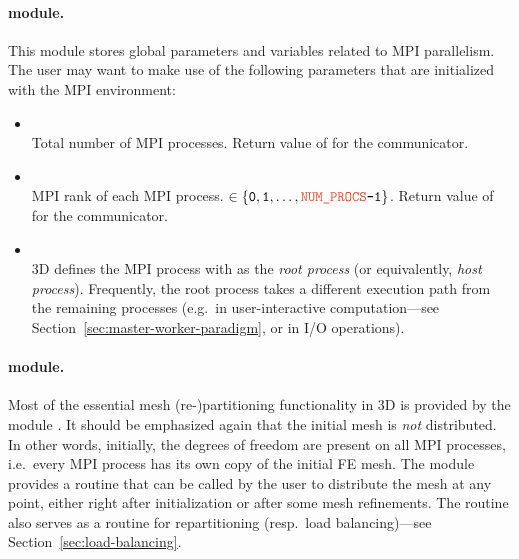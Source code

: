 \paragraph{ module.} This module stores global parameters and variables related to MPI parallelism. The user may want to make use of the following parameters that are initialized with the MPI environment:
\begin{itemize}
	\item {} \\
	Total number of MPI processes. Return value of  for the  communicator.
	\item {} \\
	MPI rank of each MPI process.  $\in \{ \code{0}, \code{1}, \dots, \code{\var{NUM\_PROCS}-1} \}$.
	Return value of  for the  communicator.
	\item {} \\
	\hp3D defines the MPI process with  as the \emph{root process} (or equivalently, \emph{host process}). Frequently, the root process takes a different execution path from the remaining processes (e.g.~in user-interactive computation---see Section~\ref{sec:master-worker-paradigm}, or in I/O operations).
\end{itemize}

\paragraph{ module.}
Most of the essential mesh (re-)partitioning functionality in \hp3D is provided by the module . It should be emphasized again that the initial mesh is \emph{not} distributed. In other words, initially, the degrees of freedom are present on all MPI processes, i.e.~every MPI process has its own copy of the initial FE mesh. The  module provides a  routine that can be called by the user to distribute the mesh at any point, either right after initialization or after some mesh refinements. The  routine also serves as a routine for repartitioning (resp.\ load balancing)---see Section~\ref{sec:load-balancing}.

